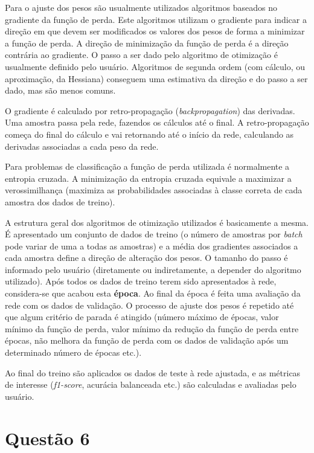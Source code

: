 \documentclass[final,3p]{elsarticle}
\numberwithin{equation}{section}
\begin{document}
        Para o ajuste dos pesos são usualmente utilizados algoritmos baseados no gradiente da função de perda. Este algoritmos utilizam o gradiente para indicar a direção em que devem ser modificados os valores dos pesos de forma a minimizar a função de perda. A direção de minimização da função de perda é a direção contrária ao gradiente. O passo a ser dado pelo algoritmo de otimização é usualmente definido pelo usuário. Algoritmos de segunda ordem (com cálculo, ou aproximação, da Hessiana) conseguem uma estimativa da direção e do passo a ser dado, mas são menos comuns.

        O gradiente é calculado por retro-propagação (\emph{backpropagation}) das derivadas. Uma amostra passa pela rede, fazendos os cálculos até o final. A retro-propagação começa do final do cálculo e vai retornando até o início da rede, calculando as derivadas associadas a cada peso da rede.

        Para problemas de classificação a função de perda utilizada é normalmente a entropia cruzada. A minimização da entropia cruzada equivale a maximizar a verossimilhança (maximiza as probabilidades associadas à classe correta de cada amostra dos dados de treino).

        A estrutura geral dos algoritmos de otimização utilizados é basicamente a mesma. É apresentado um conjunto de dados de treino (o número de amostras por \emph{batch} pode variar de uma a todas as amostras) e a média dos gradientes associados a cada amostra define a direção de alteração dos pesos. O tamanho do passo é informado pelo usuário (diretamente ou indiretamente, a depender do algoritmo utilizado). Após todos os dados de treino terem sido apresentados à rede, considera-se que acabou esta \textbf{época}. Ao final da época é feita uma avaliação da rede com os dados de validação. O processo de ajuste dos pesos é repetido até que algum critério de parada é atingido (número máximo de épocas, valor mínimo da função de perda, valor mínimo da redução da função de perda entre épocas, não melhora da função de perda com os dados de validação após um determinado número de épocas etc.).

        Ao final do treino são aplicados os dados de teste à rede ajustada, e as métricas de interesse (\emph{f1-score}, acurácia balanceada etc.) são calculadas e avaliadas pelo usuário.


\section{Questão 6}
\end{document}
